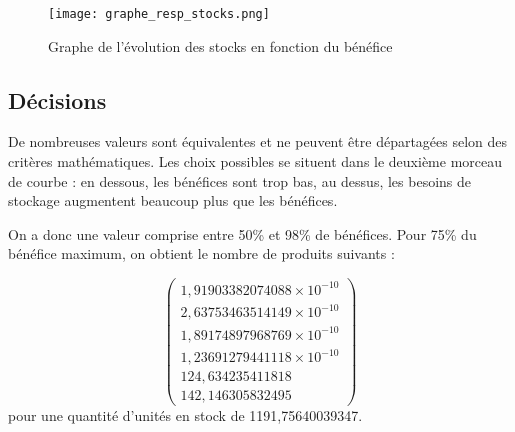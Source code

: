 \begin{figure}[!ht]
	\texttt{[image: graphe\_resp\_stocks.png]}
	\caption{Graphe de l'évolution des stocks en fonction du bénéfice}
\end{figure}


\subsection{Décisions}
De nombreuses valeurs sont équivalentes et ne peuvent être départagées selon des
critères mathématiques. Les choix possibles se situent dans le deuxième morceau
de courbe : en dessous, les bénéfices sont trop bas, au dessus, les besoins de
stockage augmentent beaucoup plus que les bénéfices.

On a donc une valeur comprise entre 50\% et 98\% de bénéfices. Pour 75\% du
bénéfice maximum, on obtient le nombre de produits suivants :

\begin{equation}
\begin{pmatrix}
1,91903382074088 \times 10^{-10} \\
2,63753463514149 \times 10^{-10} \\ 
1,89174897968769 \times 10^{-10} \\
1,23691279441118 \times 10^{-10} \\ 
124,634235411818 \\
142,146305832495 
\end{pmatrix}
\end{equation}
pour une quantité d'unités en stock de 1191,75640039347.



